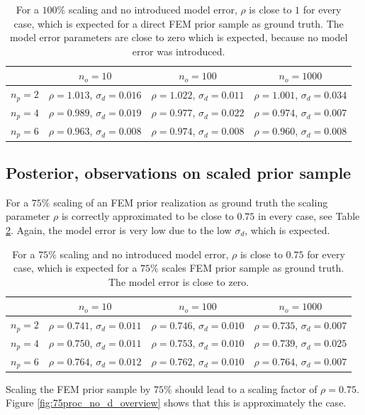 \documentclass[%
  a4paper,oneside,%
  11pt,%
  smallchapters,
  style=printdev,
  extramargin,
  green,%
  rgb, <cmyk>
  ]{tubsbook}
\begin{document}
\begin{table}[]
\centering\caption{For a $100\%$ scaling and no introduced model error, $\rho$ is close to $1$ for every case, which is expected for a direct FEM prior sample as ground truth. The model error parameters are close to zero which is expected, because no model error was introduced.}
\label{tab:rho100p_nod}
\begin{tabular}{@{}cccc@{}}
\toprule
  & $n_o = 10$ & $n_o = 100$ & $n_o = 1000$ \\ \midrule
$n_p = 2$           & $\rho=1.013$, $\sigma_d=0.016$      & $\rho=1.022$, $\sigma_d=0.011$      & $\rho=1.001$, $\sigma_d=0.034$         \\
$n_p = 4$           & $\rho=0.989$, $\sigma_d=0.019$      & $\rho=0.977$, $\sigma_d=0.022$      & $\rho=0.974$, $\sigma_d=0.007$        \\
$n_p = 6$           & $\rho=0.963$, $\sigma_d=0.008$     & $\rho=0.974$, $\sigma_d=0.008$      & $\rho=0.960$, $\sigma_d=0.008$        \\ \bottomrule
\end{tabular}
\end{table}
%
\FloatBarrier


\subsection{Posterior, observations on scaled prior sample}
\label{sec:scaled2D}
For a $75\%$ scaling of an FEM prior realization as ground truth the scaling parameter $\rho$ is correctly approximated to be close to $0.75$ in every case, see Table \ref{tab:rho75p_nod}. Again, the model error is very low due to the low $\sigma_d$, which is expected.
\begin{table}[]
\centering
\caption{For a $75\%$ scaling and no introduced model error, $\rho$ is close to $0.75$ for every case, which is expected for a $75 \%$ scales FEM prior sample as ground truth. The model error is close to zero.}
\label{tab:rho75p_nod}
\begin{tabular}{@{}cccc@{}}
\toprule
  & $n_o = 10$ & $n_o = 100$ & $n_o = 1000$ \\ \midrule
$n_p = 2$           & $\rho=0.741$, $\sigma_d=0.011$      & $\rho=0.746$, $\sigma_d=0.010$      & $\rho=0.735$, $\sigma_d=0.007$         \\
$n_p = 4$           & $\rho=0.750$, $\sigma_d=0.011$      & $\rho=0.753$, $\sigma_d=0.010$      & $\rho=0.739$, $\sigma_d=0.025$        \\
$n_p = 6$           & $\rho=0.764$, $\sigma_d=0.012$     & $\rho=0.762$, $\sigma_d=0.010$      & $\rho=0.764$, $\sigma_d=0.007$        \\ \bottomrule
\end{tabular}
\end{table}
%
Scaling the FEM prior sample by $75\%$ should lead to a scaling factor of $\rho = 0.75$. Figure \ref{fig:75proc_no_d_overview} shows that this is approximately the case.
\end{document}
